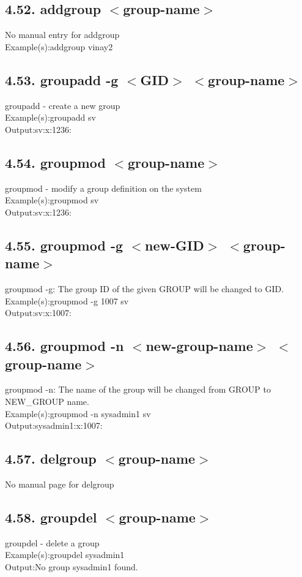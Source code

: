 \documentclass[11pt,a4]{article}
\begin{document}
\begin{enumerate}
\subsection*{4.52. addgroup $<$group-name$>$}
No manual entry for addgroup\\
Example(s):addgroup  vinay2
\subsection*{4.53. groupadd -g $<$GID$>$ $<$group-name$>$}
groupadd - create a new group\\
Example(s):groupadd sv\\
Output:sv:x:1236:

\subsection*{4.54. groupmod $<$group-name$>$}
groupmod - modify a group definition on the system\\
Example(s):groupmod sv\\
Output:sv:x:1236:
\subsection*{4.55. groupmod -g $<$new-GID$>$ $<$group-name$>$}
groupmod -g: The group ID of the given GROUP will be changed to GID.\\
Example(s):groupmod -g 1007 sv\\
Output:sv:x:1007:

\subsection*{4.56. groupmod -n $<$new-group-name$>$ $<$group-name$>$}
 groupmod -n: The name of the group will be changed from GROUP to NEW\_GROUP name.\\
 Example(s):groupmod -n sysadmin1 sv\\
 Output:sysadmin1:x:1007:

\subsection*{4.57. delgroup $<$group-name$>$}
No manual page for delgroup
\subsection*{4.58. groupdel $<$group-name$>$}
 groupdel - delete a group\\
Example(s):groupdel sysadmin1\\
Output:No group sysadmin1 found.


\end{enumerate}
\end{document}
